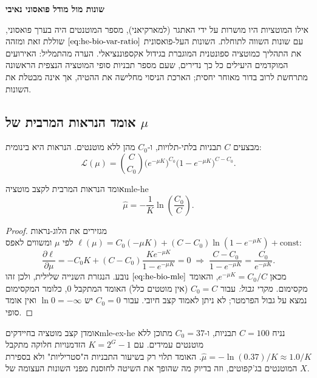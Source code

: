\begin{remark}
\textbf{שונות מול מודל פואסוני נאיבי}\par
אילו המוטציות היו מושרות על ידי האתגר (למארקיאני), מספר המוטנטים היה בערך פואסוני, עם שונות השווה לתוחלת. השונות העל-פואסונית \(\eqref{eq:he-bio-var-ratio}\) שוללת זאת ומזהה את התהליך כמוטציה ספונטנית המוגברת בגידול אקספוננציאלי. הערה מהתמליל: האירועים המוקדמים היעילים כל כך נדירים, שעם מספר תבניות סופי המוטציה הנצפית הראשונה מתרחשת לרוב בדור מאוחר יחסית; הארכת הניסוי מחלישה את ההטיה, אך אינה מבטלת את השונות.
\end{remark}

\subsection*{אומד הנראות המרבית של \(\mu\)}
מבצעים \(C\) תבניות בלתי-תלויות, ו-\(C_0\) מהן ללא מוטנטים. הנראות היא בינומית:
\begin{equation}\label{eq:he-bio-likelihood}
\mathcal{L}(\mu)=\binom{C}{C_0}\bigl(e^{-\mu K}\bigr)^{C_0}
                  \bigl(1-e^{-\mu K}\bigr)^{C-C_0}.
\end{equation}
\begin{theorem}{אומד הנראות המרבית לקצב מוטציה}{mle-he}
\begin{equation}\label{eq:he-bio-mle}
\boxed{\widehat{\mu}=-\frac{1}{K}\ln\!\left(\frac{C_0}{C}\right)} .
\end{equation}
\end{theorem}
\begin{proof}
מגזירים את הלוג-נראות
\(\ell(\mu) = C_0(-\mu K) + (C-C_0)\ln(1-e^{-\mu K}) + \text{const}\) לפי \(\mu\) ומשווים לאפס:
\begin{equation}
\frac{\partial\ell}{\partial\mu} = -C_0K + (C-C_0)\frac{K e^{-\mu K}}{1-e^{-\mu K}} = 0
\;\Longrightarrow\; \frac{C-C_0}{1-e^{-\mu K}} = \frac{C_0}{e^{-\mu K}} .
\end{equation}
מכאן \(e^{-\mu K} = C_0/C\), והאומד \(\eqref{eq:he-bio-mle}\) נובע. הנגזרת השנייה שלילית, ולכן זהו מקסימום. \emph{מקרי גבול:} עבור \(C_0 = C\) (אין מוטטים כלל) האומד המתקבל \(0\), כלומר המקסימום נמצא על גבול הפרמטר; לא ניתן לאמוד קצב חיובי. עבור \(C_0 = 0\) יש \(\ln 0 = -\infty\) ואין אומד סופי.
\end{proof}
\begin{example}{אומדן קצב מוטציה בחיידקים}{mle-ex-he}
נניח \(C=100\) תבניות, ו-\(C_0=37\) מתוכן ללא מוטנטים עמידים. עם \(K=2^{G}-1\) הזדמנויות חלוקה מתקבל \(\widehat{\mu}=-\ln(0.37)/K \approx 1.0/K\). האומד תלוי רק בשיעור התבניות ה"סטריליות" ולא בספירת המוטנטים בג'קפוטים, וזה בדיוק מה שהופך את השיטה לחוסנת מפני השונות העצומה של \(X\).
\end{example}

